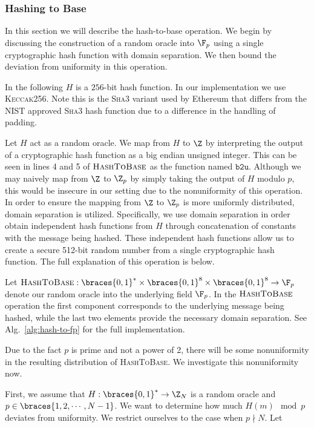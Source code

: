 \subsubsection{Hashing to Base}
\label{sssec:hash-to-base}

In this section we will describe the hash-to-base operation.
We begin by discussing the construction of a random oracle into
$\F_{p}$ using a single cryptographic hash function with
domain separation.
We then bound the deviation from uniformity in this operation.

In the following $H$ is a $256$-bit hash function.
In our implementation we use \textsc{Keccak256}.
Note this is the \textsc{Sha3} variant used by Ethereum
that differs from the NIST approved \textsc{Sha3} hash function due to a
difference in the handling of padding.

Let $H$ act as a random oracle.
We map from $H$ to $\Z$ by interpreting the output of a
cryptographic hash function as a big endian unsigned integer.
This can be seen in lines 4 and 5 of $\textsc{HashToBase}$
as the function named $\texttt{b2u}$.
Although we may naively map from $\Z$ to $\Z_{p}$ by simply taking the
output of $H$ modulo $p$, this would be insecure in our setting due to the
nonuniformity of this operation.
In order to ensure the mapping from $\Z$ to $\Z_{p}$ is more
uniformly distributed, domain separation is utilized.
Specifically, we use domain separation in order obtain independent hash
functions from $H$ through concatenation of constants with the message being
hashed.
These independent hash functions allow us to create a secure 512-bit random
number from a single cryptographic hash function.
The full explanation of this operation is below.

Let $\textsc{HashToBase}:\braces{0,1}^{*}\times\braces{0,1}^{8}\times
\braces{0,1}^{8}\to\F_{p}$ denote our random oracle into the
underlying field $\F_{p}$.
In the $\textsc{HashToBase}$ operation the first component corresponds to the
underlying message being hashed, while the last two elements provide the
necessary domain separation.
See Alg.~\ref{alg:hash-to-fp} for the full implementation.

Due to the fact $p$ is prime and not a power of 2, there will be some
nonuniformity in the resulting distribution of \textsc{HashToBase}.
We investigate this nonuniformity now.

First, we assume that $H:\braces{0,1}^{*}\to\Z_{N}$
is a random oracle and $p\in\braces{1,2,\cdots,N-1}$.
We want to determine how much $H(m)\mod p$ deviates from uniformity.
We restrict ourselves to the case when $p\nmid N$.
Let

